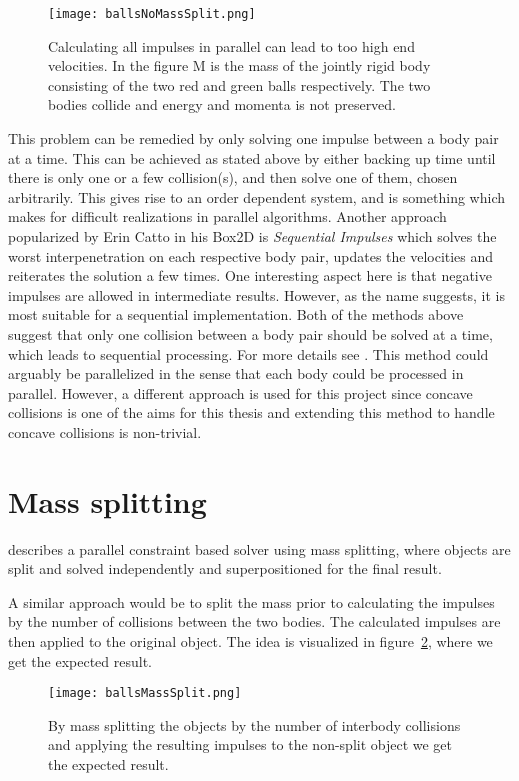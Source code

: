 \begin{figure}[H]
  \centering
  \texttt{[image: ballsNoMassSplit.png]}
  \caption{Calculating all impulses in parallel can lead to too high end velocities.
  In the figure M is the mass of the jointly rigid body consisting of
  the two red and green balls respectively. The two bodies collide and energy and momenta is not preserved.}
  \label{fig:noSplit}
\end{figure}

This problem can be remedied by only solving one impulse between a body pair at a time.
This can be achieved as stated above by either backing up time until there
is only one or a few collision(s), and then solve one of them, chosen
arbitrarily. This gives rise to an order dependent system, and is something which
makes for difficult realizations in parallel algorithms. Another approach popularized
by Erin Catto in his Box2D is \textit{Sequential Impulses} which solves the worst interpenetration
on each respective body pair, updates the velocities and reiterates the solution a few times.
One interesting aspect here is that negative impulses are allowed in intermediate
results. However, as the name suggests, it is most suitable for a sequential implementation.
Both of the methods above suggest that only one collision between a body pair should
be solved at a time, which leads to sequential processing. For more details see \cite{catto}.
This method could arguably be parallelized in the sense that each body could be
processed in parallel. However, a different approach is used for this project since
concave collisions is one of the aims for this thesis and extending this method to
handle concave collisions is non-trivial.

\section{Mass splitting}\label{sec:massSplit}
\cite{tonge} describes a parallel constraint based solver
using mass splitting, where objects are split and solved independently and superpositioned
for the final result.

A similar approach would be to split the mass prior to
calculating the impulses by the number of collisions between the two bodies. The
calculated impulses are then applied to the original object. The idea is visualized in figure~\ref{fig:massSplit}, where
we get the expected result.

\begin{figure}[H]
  \centering
  \texttt{[image: ballsMassSplit.png]}
  \caption{By mass splitting the objects by the number of interbody collisions
  and applying the resulting impulses to the non-split object we get the expected result.}
  \label{fig:massSplit}
\end{figure}

